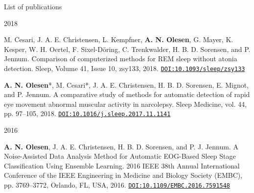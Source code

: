 \documentclass{resume} %
\begin{document}
\begin{rSection}{List of publications}
\begin{rSubsection}{2018}{}{}{}
	    \item M. Cesari, J. A. E. Christensen, L. Kempfner, \textbf{A. N. Olesen}, G. Mayer, K. Kesper, W. H. Oertel, F. Sixel-Döring, C. Trenkwalder, H. B. D. Sorensen, and P. Jennum. Comparison of computerized methods for REM sleep without atonia detection. Sleep, Volume 41, Issue 10, zsy133, 2018. \href{https://doi.org/10.1093/sleep/zsy133}{\texttt{DOI:10.1093/sleep/zsy133}}
	    
	    \item \textbf{A. N. Olesen}\mbox{*}, M. Cesari\mbox{*}, J. A. E. Christensen, H. B. D. Sorensen, E. Mignot, and P. Jennum. A comparative study of methods for automatic detection of rapid eye movement abnormal muscular activity in narcolepsy. Sleep Medicine, vol. 44, pp. 97–105, 2018. \href{https://doi.org/10.1016/j.sleep.2017.11.1141}{\texttt{DOI:10.1016/j.sleep.2017.11.1141}}
	\end{rSubsection}
	
	\begin{rSubsection}{2016}{}{}{}
	    \item \textbf{A. N. Olesen}, J. A. E. Christensen, H. B. D. Sorensen, and P. J. Jennum. A Noise-Assisted Data Analysis Method for Automatic EOG-Based Sleep Stage Classification Using Ensemble Learning. 2016 IEEE 38th Annual International Conference of the IEEE Engineering in Medicine and Biology Society (EMBC), pp. 3769–3772, Orlando, FL, USA, 2016. \href{https://doi.org/10.1109/EMBC.2016.7591548}{\texttt{DOI:10.1109/EMBC.2016.7591548}}
	\end{rSubsection}
	
	
\end{rSection}


\end{document}
